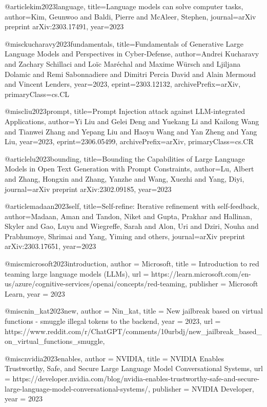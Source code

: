 @article{kim2023language,
  title={Language models can solve computer tasks},
  author={Kim, Geunwoo and Baldi, Pierre and McAleer, Stephen},
  journal={arXiv preprint arXiv:2303.17491},
  year={2023}
}

@misc{kucharavy2023fundamentals,
      title={Fundamentals of Generative Large Language Models and Perspectives in Cyber-Defense},
      author={Andrei Kucharavy and Zachary Schillaci and Loïc Maréchal and Maxime Würsch and Ljiljana Dolamic and Remi Sabonnadiere and Dimitri Percia David and Alain Mermoud and Vincent Lenders},
      year={2023},
      eprint={2303.12132},
      archivePrefix={arXiv},
      primaryClass={cs.CL}
}

@misc{liu2023prompt,
      title={Prompt Injection attack against LLM-integrated Applications},
      author={Yi Liu and Gelei Deng and Yuekang Li and Kailong Wang and Tianwei Zhang and Yepang Liu and Haoyu Wang and Yan Zheng and Yang Liu},
      year={2023},
      eprint={2306.05499},
      archivePrefix={arXiv},
      primaryClass={cs.CR}
}

@article{lu2023bounding,
  title={Bounding the Capabilities of Large Language Models in Open Text Generation with Prompt Constraints},
  author={Lu, Albert and Zhang, Hongxin and Zhang, Yanzhe and Wang, Xuezhi and Yang, Diyi},
  journal={arXiv preprint arXiv:2302.09185},
  year={2023}
}

@article{madaan2023self,
  title={Self-refine: Iterative refinement with self-feedback},
  author={Madaan, Aman and Tandon, Niket and Gupta, Prakhar and Hallinan, Skyler and Gao, Luyu and Wiegreffe, Sarah and Alon, Uri and Dziri, Nouha and Prabhumoye, Shrimai and Yang, Yiming and others},
  journal={arXiv preprint arXiv:2303.17651},
  year={2023}
}

@misc{microsoft2023introduction,
  author = {Microsoft},
  title = {Introduction to red teaming large language models (LLMs)},
  url = {https://learn.microsoft.com/en-us/azure/cognitive-services/openai/concepts/red-teaming},
  publisher = {Microsoft Learn},
  year = {2023}
}

@misc{nin_kat2023new,
    author = {Nin_kat},
    title = {New jailbreak based on virtual functions - smuggle illegal tokens to the backend},
    year = {2023},
    url = {https://www.reddit.com/r/ChatGPT/comments/10urbdj/new_jailbreak_based_on_virtual_functions_smuggle},
}

@misc{nvidia2023enables,
  author = {NVIDIA},
  title = {NVIDIA Enables Trustworthy, Safe, and Secure Large Language Model Conversational Systems},
  url = {https://developer.nvidia.com/blog/nvidia-enables-trustworthy-safe-and-secure-large-language-model-conversational-systems/},
  publisher = {NVIDIA Developer},
  year = {2023}
}


